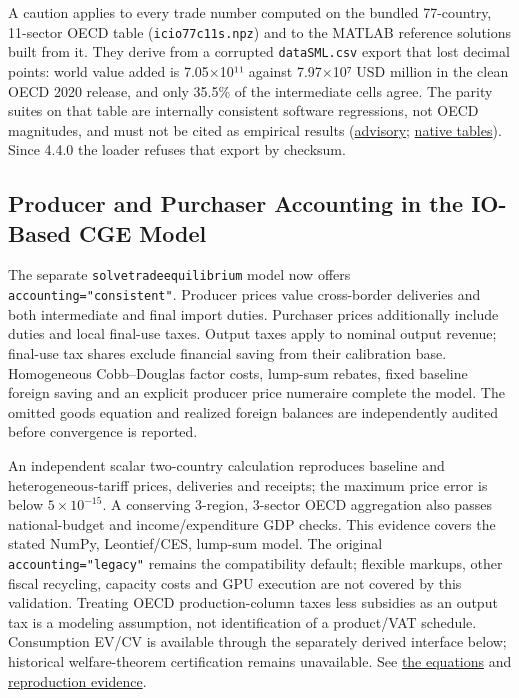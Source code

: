 \documentclass[11pt,letterpaper]{article}
\renewcommand{\_}{\pmunderscore\allowbreak}
\begin{document}
A caution applies to every trade number computed on the bundled 77-country, 11-sector OECD table (\texttt{icio\_77c\_11s.npz}) and to the MATLAB reference solutions built from it. They derive from a corrupted \texttt{data\_2020\_SML.csv} export that lost decimal points: world value added is 7.05×10¹¹ against 7.97×10⁷ USD million in the clean OECD 2020 release, and only 35.5\% of the intermediate cells agree. The parity suites on that table are internally consistent software regressions, not OECD magnitudes, and must not be cited as empirical results (\href{https://github.com/jalonso1979/puremacro/blob/v4.6.0/docs/ADVISORY.md}{advisory}; \href{https://github.com/jalonso1979/puremacro/blob/v4.6.0/docs/trade_mrio.md}{native tables}). Since 4.4.0 the loader refuses that export by checksum.

\subsection{Producer and Purchaser Accounting in the IO-Based CGE Model}\label{producer-and-purchaser-accounting-in-the-io-based-cge-model}

The separate \texttt{solve\_trade\_equilibrium} model now offers \texttt{accounting="consistent"}.
Producer prices value cross-border deliveries and both intermediate and final
import duties. Purchaser prices additionally include duties and local final-use
taxes. Output taxes apply to nominal output revenue; final-use tax shares exclude
financial saving from their calibration base. Homogeneous Cobb--Douglas factor
costs, lump-sum rebates, fixed baseline foreign saving and an explicit producer
price numeraire complete the model. The omitted goods equation and realized
foreign balances are independently audited before convergence is reported.

An independent scalar two-country calculation reproduces baseline and
heterogeneous-tariff prices, deliveries and receipts; the maximum price error is
below \(5\times10^{-15}\). A conserving 3-region, 3-sector OECD aggregation also
passes national-budget and income/expenditure GDP checks. This evidence covers
the stated NumPy, Leontief/CES, lump-sum model. The original
\texttt{accounting="legacy"} remains the compatibility default; flexible markups,
other fiscal recycling, capacity costs and GPU execution are not covered by
this validation. Treating OECD production-column taxes less subsidies as an
output tax is a modeling assumption, not identification of a product/VAT
schedule. Consumption EV/CV is available through the separately derived interface below; historical welfare-theorem certification remains unavailable. See
\href{https://github.com/jalonso1979/puremacro/blob/v4.6.0/docs/trade_accounting.md}{the equations} and
\href{https://github.com/jalonso1979/puremacro/blob/v4.6.0/reviews/2026-09-20-trade-accounting/REPORT.md}{reproduction evidence}.
\end{document}
